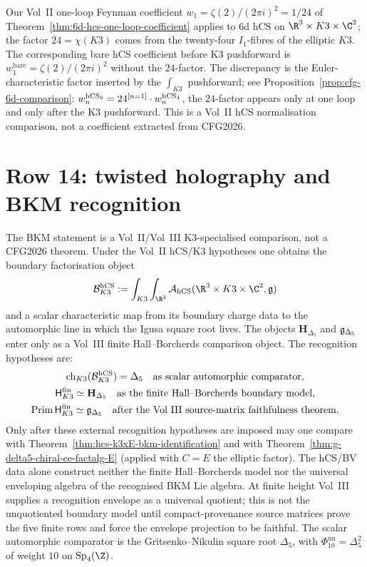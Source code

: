 \begin{remark}
\label{rem:cfg-row-13-feynman}
Our Vol~II one-loop Feynman coefficient
$w_1 = \zeta(2)/(2\pi i)^2 = 1/24$ of
Theorem~\ref{thm:6d-hcs-one-loop-coefficient} applies to 6d hCS on
$\R^3\times K3\times \C^2$; the factor $24 = \chi(K3)$ comes from the
twenty-four $I_1$-fibres of the elliptic $K3$. The corresponding
bare hCS coefficient before K3 pushforward is
$w_1^{\mathrm{bare}} = \zeta(2)/(2\pi i)^2$ without the $24$-factor.
The discrepancy is the Euler-characteristic factor inserted by the
$\int_{K3}$ pushforward; see
Proposition~\ref{prop:cfg-6d-comparison}:
$w_n^{\mathrm{hCS}_6} = 24^{[n=1]}\cdot w_n^{\mathrm{hCS}_4}$, the $24$-factor
appears only at one loop and only after the K3 pushforward. This is a
Vol~II hCS normalisation comparison, not a coefficient extracted from
CFG2026.
\end{remark}

\section{Row 14: twisted holography and BKM recognition}
\label{sec:cfg-row-14-bkm}

\begin{theorem}
\label{thm:cfg-row-14}
The BKM statement is a Vol~II/Vol~III K3-specialised comparison, not a
CFG2026 theorem. Under the Vol~II hCS/K3 hypotheses one obtains the
boundary factorisation object
\[
 \cB^{\hCS}_{K3}:=
 \int_{K3}\int_{\R^3}
 \cA_{\hCS}(\R^3\times K3\times\C^2,\fg)
\]
and a scalar characteristic map from its boundary charge data to the
automorphic line in which the Igusa square root lives. The objects
$\mathbf H_{\Delta_5}$ and $\mathfrak{g}_{\Delta_5}$ enter only as a Vol~III
finite Hall--Borcherds comparison object. The recognition hypotheses
are:
\[
\begin{gathered}
 \mathrm{ch}_{K3}(\mathcal{B}^{\mathrm{hCS}}_{K3})=\Delta_5
 \quad\text{as scalar automorphic comparator},\\
\mathsf H^{\mathrm{fin}}_{K3}\simeq \mathbf H_{\Delta_5}
\quad\text{as the finite Hall--Borcherds boundary model},\\
\mathrm{Prim}\,\mathsf H^{\mathrm{fin}}_{K3}\simeq \mathfrak{g}_{\Delta_5}
\quad\text{after the Vol~III source-matrix faithfulness theorem}.
\end{gathered}
\]
Only after these external recognition hypotheses are imposed may one
compare with
Theorem~\ref{thm:hcs-k3xE-bkm-identification} and with
Theorem~\ref{thm:g-delta5-chiral-ce-factalg-E} (applied with
$C = E$ the elliptic factor). The hCS/BV data alone construct neither
the finite Hall--Borcherds model nor the universal enveloping algebra of
the recognised BKM Lie algebra. At finite height Vol~III supplies a
recognition envelope as a universal quotient; this is not the
unquotiented boundary model until compact-provenance source matrices
prove the five finite rows and force the envelope projection to be
faithful.
The scalar automorphic comparator is the
Gritsenko--Nikulin square root $\Delta_5$, with
$\Phi_{10}^{\mathrm{un}}=\Delta_5^2$ of weight $10$ on
$\mathrm{Sp}_4(\Z)$.
\end{theorem}

